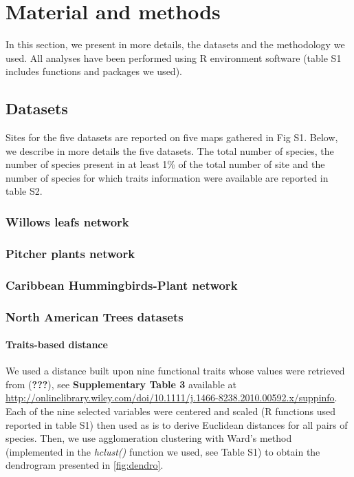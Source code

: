\section{Material and methods}\label{material-and-methods}

In this section, we present in more details, the datasets and the
methodology we used. All analyses have been performed using R
environment software (table S1 includes functions and packages we used).

\subsection{Datasets}\label{datasets}

Sites for the five datasets are reported on five maps gathered in Fig
S1. Below, we describe in more details the five datasets. The total
number of species, the number of species present in at least 1\% of the
total number of site and the number of species for which traits
information were available are reported in table S2.

\subsubsection{Willows leafs network}\label{willows-leafs-network}

\subsubsection{Pitcher plants network}\label{pitcher-plants-network}

\subsubsection{Caribbean Hummingbirds-Plant
network}\label{caribbean-hummingbirds-plant-network}

\subsubsection{North American Trees
datasets}\label{north-american-trees-datasets}

\paragraph{Traits-based distance}\label{traits-based-distance}

We used a distance built upon nine functional traits whose values were
retrieved from ({\textbf{???}}), see \textbf{Supplementary Table 3}
available at
\url{http://onlinelibrary.wiley.com/doi/10.1111/j.1466-8238.2010.00592.x/suppinfo}.
Each of the nine selected variables were centered and scaled (R
functions used reported in table S1) then used as is to derive Euclidean
distances for all pairs of species. Then, we use agglomeration
clustering with Ward's method (implemented in the \emph{hclust()}
function we used, see Table S1) to obtain the dendrogram presented in
\ref{fig:dendro}.

